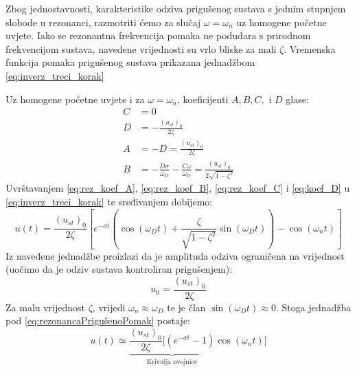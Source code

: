 Zbog jednostavnosti, karakteristike odziva prigušenog sustava s jednim stupnjem
slobode u rezonanci, razmotriti ćemo za slučaj $\omega = \omega_n$ uz
homogene početne uvjete. Iako se rezonantna frekvencija pomaka ne podudara s 
prirodnom frekvencijom sustava, navedene vrijednosti su vrlo bliske za mali $\zeta$. 
Vremenska funkcija pomaka prigušenog sustava prikazana jednadžbom \eqref{eq:inverz_treci_korak}

Uz homogene početne uvjete i za $\omega=\omega_n$, koeficijenti $A,B,C,\text{ i }D$
glase:
\begin{align}
    C &= 0 \label{eq:rez_koef_C}\\
    D &= -\frac{(u_{st})_0}{2\zeta}\label{eq:rez_koef_D}\\
    A &= -D = \frac{(u_{st})_0}{2\zeta}\label{eq:rez_koef_A}\\
    B &= -\frac{D\sigma}{\omega_D}-\frac{C\omega}{\omega_D}=
          \frac{(u_{st})_0}{2\sqrt{1-\zeta^2}}\label{eq:rez_koef_B}
\end{align}
Uvrštavanjem \eqref{eq:rez_koef_A}, \eqref{eq:rez_koef_B}, \eqref{eq:rez_koef_C} i \eqref{eq:koef_D}
u \eqref{eq:inverz_treci_korak} te sređivanjem dobijemo:
\begin{equation}\label{eq:rezonancaPrigušenoPomak}
    u(t)=\frac{(u_{st})_0}{2\zeta}\left[
        e^{-\sigma t} \left(
            \cos(\omega_D t)+\frac{\zeta}{\sqrt{1-\zeta^2}}\sin(\omega_D t)
            \right)
        -\cos(\omega_n t)
        \right]
\end{equation}
Iz navedene jednadžbe proizlazi da je amplituda odziva ograničena na vrijednost
(uočimo da je odziv sustava kontroliran prigušenjem):
\begin{equation}\label{eq:rezonanca_amplituda}
    u_0=\frac{(u_{st})_0}{2\zeta}
\end{equation}
Za malu vrijednost $\zeta$, vrijedi $\omega_n\approx\omega_D$ te je član
$\sin(\omega_Dt) \approx 0$. Stoga jednadžba pod \eqref{eq:rezonancaPrigušenoPomak}
postaje:
\begin{equation}\label{eq:rezonancaOdzivAproksimacija}
    u(t)\simeq\underbrace{
        \frac{(u_{st})_0}{2\zeta}[(e^{-\sigma t}-1)
        }_{\text{Krivulja ovojnice}}
        \cos(\omega_nt)]
\end{equation}

